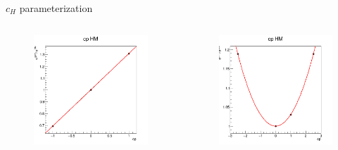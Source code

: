 \begin{frame}{$c_{H}$ parameterization}
\begin{columns}
\begin{figure}
    \centering
    \includegraphics[width=1.\textwidth]{BackUp/Part5/Img/cp_MG_Fit_HM.png}
\end{figure}
\begin{figure}
    \centering
    \includegraphics[width=1.\textwidth]{BackUp/Part5/Img/cp_MG_Fit_Quad_HM.png}
\end{figure}
\end{columns}

\end{frame}

